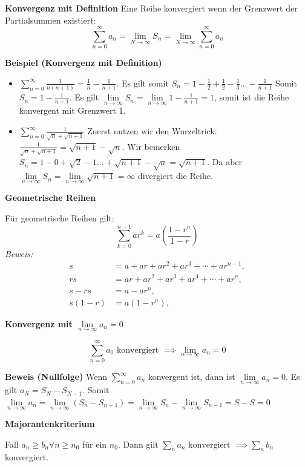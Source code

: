 \documentclass[25pt]{sciposter}
\newcommand{\limm}{\lim\limits_{n \to \infty}}
\newenvironment{method}[1]{\begin{mdframed}[backgroundcolor=blue!10,innertopmargin=15pt, innerbottommargin=15pt, nobreak=true]
		\textbf{#1 }
	}
	{ 
	\end{mdframed}
}
\begin{document}
\begin{multicols}{3}
\begin{method}{Konvergenz mit Definition} Eine Reihe konvergiert wenn der Grenzwert der Partialsummen existiert:
	$$\sum_{n=0}^{\infty} a_n  = \lim\limits_{N\to\infty} S_n = \lim\limits_{N\to\infty} \sum_{n=0}^{\infty} a_n$$
\end{method}

\textbf{Beispiel (Konvergenz mit Definition)}
\begin{itemize}
	\item $\sum_{n = 0}^{\infty} \frac{1}{n(n+1)} = \frac{1}{n} - \frac{1}{n+1}$. Es gilt somit $S_n = 1 - \frac{1}{2} + \frac{1}{2} - \frac{1}{3} \ldots - \frac{1}{n+1}$ Somit $S_n = 1-\frac{1}{n+1}$. Es gilt $\limm S_n = \limm 1 - \frac{1}{n+1} = 1$, somit ist die Reihe konvergent mit Grenzwert 1.
	\item $\sum_{n = 0}^{\infty} \frac{1}{\sqrt{n} + \sqrt{n+1}} $ Zuerst nutzen wir den Wurzeltrick: $\frac{1}{\sqrt{n} + \sqrt{n+1}} = \sqrt{n+1} - \sqrt{n}$. Wir bemerken $S_n = 1 - 0 + \sqrt{2} - 1 \ldots + \sqrt{n+1} - \sqrt{n} = \sqrt{n+1}$. Da aber $\limm S_n =  \limm \sqrt{n+1} = \infty$ divergiert die Reihe.
\end{itemize}

\begin{method}{Geometrische Reihen}
	Für geometrische Reihen gilt:
	$$\sum _{k=0}^{n-1}ar^{k}=a\left({\frac {1-r^{n}}{1-r}}\right)$$
	\textit{Beweis:}{\begin{align*}s&=a+ar+ar^{2}+ar^{3}+\cdots +ar^{n-1},\\rs&=ar+ar^{2}+ar^{3}+ar^{4}+\cdots +ar^{n},\\s-rs&=a-ar^{n},\\s(1-r)&=a(1-r^{n}),\end{align*}}
\end{method}

\begin{method}{Konvergenz mit $\lim\limits_{n \to \infty } a_n = 0$}
$$\sum_{n=0}^{\infty} a_0 \text{ konvergiert } \implies \lim\limits_{n \to \infty } a_n = 0 $$
\end{method}

\textbf{Beweis (Nullfolge)} Wenn $\sum_{n = 0}^{\infty} a_n$ konvergent ist, dann ist $\limm a_n = 0$.
Es gilt $a_N = S_N - S_{N-1}$. Somit $\limm a_n = \limm (S_n - S_{n-1}) = \limm S_n - \limm S_{n-1} = S-S = 0$

\begin{method}{Majorantenkriterium}
	Fall $a_n \geq b_n \forall n \geq n_0$ für ein $n_0$. Dann gilt $\sum_n a_n \text{ konvergiert } \implies \sum_{n} b_n$ konvergiert.
\end{method}


\end{multicols}
\end{document}
